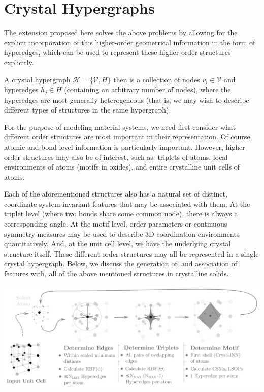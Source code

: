 \documentclass[10pt,a4paper]{article}
\begin{document}
\section{Crystal Hypergraphs}
The extension proposed here solves the above problems by allowing for the explicit incorporation of this higher-order geometrical information in the form of hyperedges, which can be used to represent these higher-order structures explicitly.



A crystal hypergraph $\mathcal{H}=\lbrace\mathcal{V}, \mathit{H} \rbrace$ then is a collection of nodes $v_i\in \mathcal{V}$ and hyperedges $h_j\in \mathit{H}$ (containing an arbitrary number of nodes), where the hyperedges are most generally heterogeneous (that is, we may wish to describe different types of structures in the same hypergraph).

For the purpose of modeling material systems, we need first consider what different order structures are most important in their representation. Of course, atomic and bond level information is particularly important. However, higher order structures may also be of interest, such as: triplets of atoms, local environments of atoms (motifs in oxides), and entire crystalline unit cells of atoms.

Each of the aforementioned structures also has a natural set of distinct, coordinate-system invariant features that may be associated with them. At the triplet level (where two bonds share some common node), there is always a corresponding angle. At the motif level, order parameters \cite{orderparam1, orderparam2} or continuous symmetry measures \cite{csm_polyhedra, chemenv} may be used to describe 3D coordination environments quantitatively. And, at the unit cell level, we have the underlying crystal structure itself.
These different order structures may all be represented in a single crystal hypergraph. Below, we discuss the generation of, and association of features with, all of the above mentioned structures in crystalline solids. 

\begin{center}
\includegraphics[scale=0.27]{crystal_hgraph_ex.pdf}
\end{center}
\end{document}
